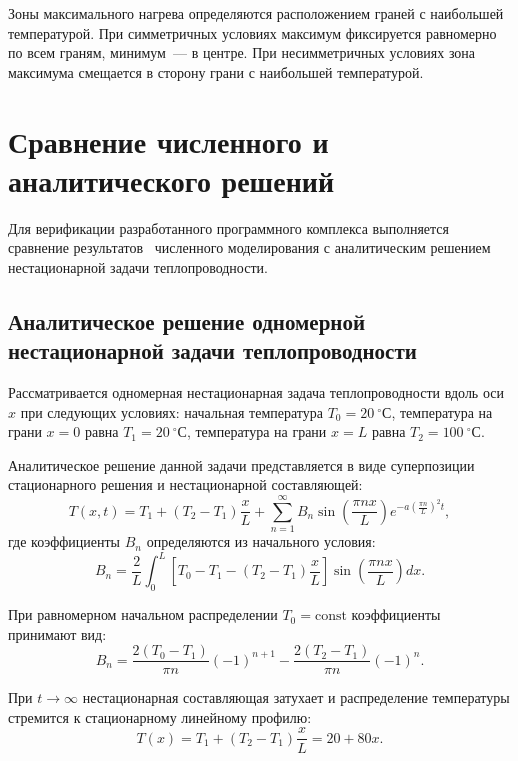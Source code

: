 Зоны максимального нагрева определяются расположением
граней с наибольшей температурой. При симметричных условиях
максимум фиксируется равномерно по всем граням, минимум~—
в центре. При несимметричных условиях зона максимума
смещается в сторону грани с наибольшей температурой.

\section{Сравнение численного и аналитического решений}

Для верификации разработанного программного комплекса выполняется 
сравнение результатов~\cite{чечулин2015качественное} численного моделирования с аналитическим 
решением нестационарной задачи теплопроводности.

\subsection{Аналитическое решение одномерной нестационарной задачи теплопроводности}

Рассматривается одномерная нестационарная задача теплопроводности
\cite{дучков1999тепловой} 
вдоль оси $x$ при следующих условиях: начальная температура 
$T_0 = 20~^\circ$С, температура на грани $x = 0$ равна 
$T_1 = 20~^\circ$С, температура на грани $x = L$ равна 
$T_2 = 100~^\circ$С.

Аналитическое решение данной задачи представляется в виде суперпозиции 
стационарного решения и нестационарной составляющей:
\begin{equation}
    T(x, t) = T_1 + (T_2 - T_1)\frac{x}{L} + 
    \sum_{n=1}^{\infty} B_n \sin\left(\frac{\pi n x}{L}\right) 
    e^{-a\left(\frac{\pi n}{L}\right)^2 t},
\end{equation}
где коэффициенты $B_n$ определяются из начального условия:
\begin{equation}
    B_n = \frac{2}{L} \int_0^L 
    \left[ T_0 - T_1 - (T_2 - T_1)\frac{x}{L} \right] 
    \sin\left(\frac{\pi n x}{L}\right) dx.
\end{equation}

При равномерном начальном распределении $T_0 = \text{const}$ 
коэффициенты принимают вид:
\begin{equation}
    B_n = \frac{2(T_0 - T_1)}{{\pi n}}(-1)^{n+1} - 
    \frac{2(T_2 - T_1)}{\pi n}(-1)^n.
\end{equation}

При $t \to \infty$ нестационарная составляющая затухает и 
распределение температуры стремится к стационарному линейному 
профилю:
\begin{equation}
    T(x) = T_1 + (T_2 - T_1)\frac{x}{L} = 20 + 80x.
\end{equation}


